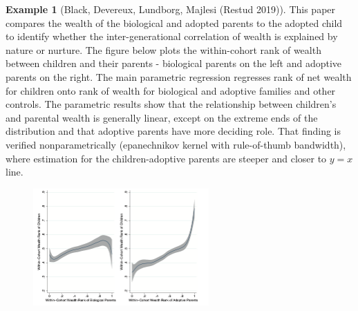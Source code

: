 \documentclass[12pt]{article}
\theoremstyle{definition}
\theoremstyle{property}
\theoremstyle{assumption}
\theoremstyle{example}
\newtheorem{example}{Example}[section]
\theoremstyle{comment}
\begin{document}
\begin{mdframed}[backgroundcolor=yellow!5] 
\begin{example}[Black, Devereux, Lundborg, Majlesi (Restud 2019)]
This paper compares the wealth of the biological and adopted parents to the adopted child to identify whether the inter-generational correlation of wealth is explained by nature or nurture. The figure below plots the within-cohort rank of wealth between children and their parents - biological parents on the left and adoptive parents on the right. The main parametric regression regresses rank of net wealth for children onto rank of wealth for biological and adoptive families and other controls. The parametric results show that the relationship between children's and parental wealth is generally linear, except on the extreme ends of the distribution and that adoptive parents have more deciding role. That finding is verified nonparametrically (epanechnikov kernel with rule-of-thumb bandwidth), where estimation for the children-adoptive parents are steeper and closer to $y=x$ line. 
\begin{figure}[H]
\centering
\includegraphics[keepaspectratio, width=0.6\textwidth]{black2.png}
\end{figure}
\end{example}


\end{mdframed}
\end{document}

